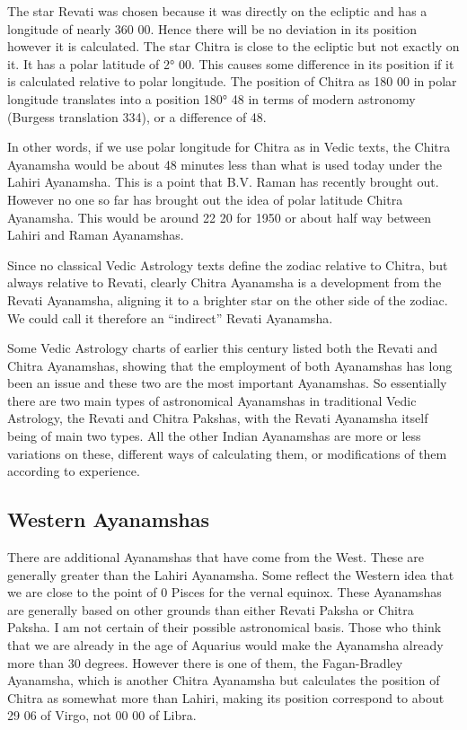  

The star Revati was chosen because it was directly on the ecliptic and has a longitude of nearly 360 00. Hence there will be no deviation in its position however it is calculated. The star Chitra is close to the ecliptic but not exactly on it. It has a polar latitude of 2° 00. This causes some difference in its position if it is calculated relative to polar longitude. The position of Chitra as 180 00 in polar longitude translates into a position 180° 48 in terms of modern astronomy (Burgess translation 334), or a difference of 48.

 

In other words, if we use polar longitude for Chitra as in Vedic texts, the Chitra Ayanamsha would be about 48 minutes less than what is used today under the Lahiri Ayanamsha. This is a point that  B.V. Raman has recently brought out. However no one so far has brought out the idea of polar latitude Chitra Ayanamsha. This would be around 22 20 for 1950 or about half way between Lahiri and Raman Ayanamshas.

 

Since no classical Vedic Astrology texts define the zodiac relative to Chitra, but always relative to Revati, clearly Chitra Ayanamsha is a development from the Revati Ayanamsha, aligning it to a brighter star on the other side of the zodiac. We could call it therefore an “indirect” Revati Ayanamsha.

 

Some Vedic Astrology charts of earlier this century listed both the Revati and Chitra Ayanamshas, showing that the employment of both Ayanamshas has long been an issue and these two are the most important Ayanamshas. So essentially there are two main types of astronomical Ayanamshas in traditional Vedic Astrology, the Revati and Chitra Pakshas, with the Revati Ayanamsha itself being of main two types. All the other Indian Ayanamshas are more or less variations on these, different ways of calculating them, or modifications of them according to experience.

 

\subsection{Western Ayanamshas}

 

There are additional Ayanamshas that have come from the West. These are generally greater than the Lahiri Ayanamsha. Some reflect the Western idea that we are close to the point of 0 Pisces for the vernal equinox. These Ayanamshas are generally based on other grounds than either Revati Paksha or Chitra Paksha. I am not certain of their possible astronomical basis. Those who think that we are already in the age of Aquarius would make the Ayanamsha already more than 30 degrees. However there is one of them, the Fagan-Bradley Ayanamsha, which is another Chitra Ayanamsha but calculates the position of Chitra as somewhat more than Lahiri, making its position correspond to about 29 06 of Virgo, not 00 00 of Libra.

